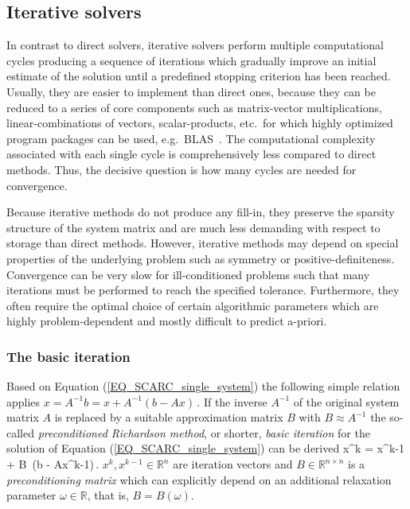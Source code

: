 \subsection{Iterative solvers}
In contrast to direct solvers, iterative solvers perform multiple computational cycles producing a sequence of iterations which gradually improve an initial estimate of the solution until a predefined stopping criterion has been reached. 
%
Usually, they are easier to implement than direct ones, because they can be reduced to a series of core components such as matrix-vector multiplications, linear-combinations of vectors, scalar-products, etc.\ for which highly optimized program packages can be used, e.g.\ BLAS~\cite{Dongarra:2002}.
%
The computational complexity associated with each single cycle is comprehensively less compared to direct methods. Thus, the decisive question is how many cycles are needed for convergence.

Because iterative methods do not produce any fill-in, they preserve the sparsity structure of the system matrix and are much less demanding with respect to storage than direct methods.
%
However, iterative methods may depend on special properties of the underlying problem such as symmetry or positive-definiteness. Convergence can be very slow for ill-conditioned problems such that many iterations must be performed to reach the specified tolerance. Furthermore, they often require the optimal choice of certain algorithmic parameters which are highly problem-dependent and mostly difficult to predict a-priori.

\subsubsection{The basic iteration}
\label{SEC_SCARC_basic_iteration}
Based on Equation (\ref{EQ_SCARC_single_system}) the following simple relation applies
$ %
x = A^{-1} b = x + A^{-1} (b-Ax)\,.
$ %
If the inverse $A^{-1}$ of the original system matrix $A$ is replaced by a suitable approximation matrix $B$ with $B \approx A^{-1}$
the so-called {\it preconditioned Richardson method}, or shorter, {\it basic iteration} for the solution of Equation (\ref{EQ_SCARC_single_system}) can be derived
\be 
  x^k = x^{k-1} + B\, (b - Ax^{k-1})\,. 
\label{EQ_SCARC_basic_iteration}
\ee
$x^k, x^{k-1} \in \mathbb{R}^{n}$ are iteration vectors and
$B \in \mathbb{R}^{n \times n}$ is a {\it preconditioning matrix} which can explicitly depend on an additional relaxation parameter $\omega\in \mathbb{R}$, that is, $B = B(\omega)$.

